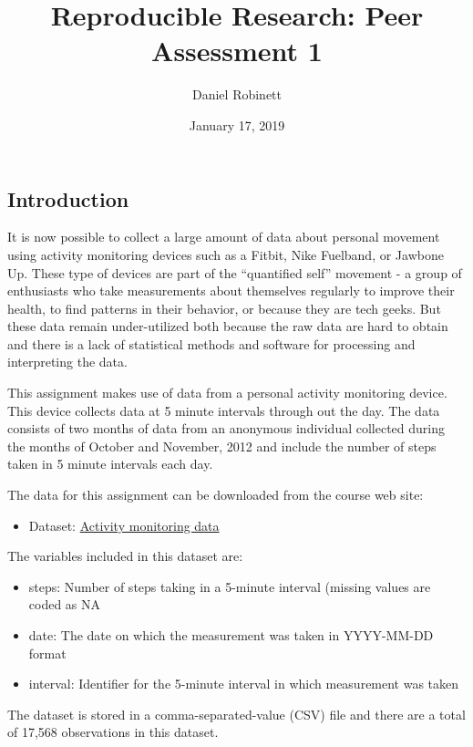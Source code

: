 \documentclass[]{article}
\title{Reproducible Research: Peer Assessment 1}
\author{Daniel Robinett}
\date{January 17, 2019}
\providecommand{\tightlist}{%
  \setlength{\itemsep}{0pt}\setlength{\parskip}{0pt}}
\begin{document}
\maketitle

\subsection{Introduction}\label{introduction}

It is now possible to collect a large amount of data about personal
movement using activity monitoring devices such as a Fitbit, Nike
Fuelband, or Jawbone Up. These type of devices are part of the
``quantified self'' movement - a group of enthusiasts who take
measurements about themselves regularly to improve their health, to find
patterns in their behavior, or because they are tech geeks. But these
data remain under-utilized both because the raw data are hard to obtain
and there is a lack of statistical methods and software for processing
and interpreting the data.

This assignment makes use of data from a personal activity monitoring
device. This device collects data at 5 minute intervals through out the
day. The data consists of two months of data from an anonymous
individual collected during the months of October and November, 2012 and
include the number of steps taken in 5 minute intervals each day.

The data for this assignment can be downloaded from the course web site:

\begin{itemize}
\tightlist
\item
  Dataset:
  \href{https://d396qusza40orc.cloudfront.net/repdata\%2Fdata\%2Factivity.zip}{Activity
  monitoring data}
\end{itemize}

The variables included in this dataset are:

\begin{itemize}
\item
  steps: Number of steps taking in a 5-minute interval (missing values
  are coded as NA
\item
  date: The date on which the measurement was taken in YYYY-MM-DD format
\item
  interval: Identifier for the 5-minute interval in which measurement
  was taken
\end{itemize}

The dataset is stored in a comma-separated-value (CSV) file and there
are a total of 17,568 observations in this dataset.
\end{document}
